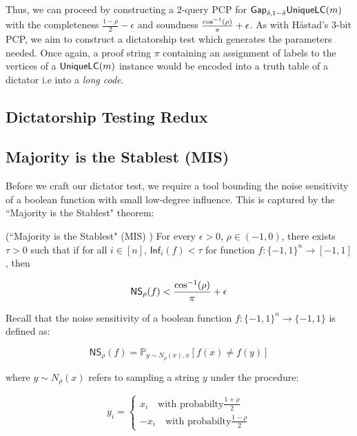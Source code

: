 Thus, we can proceed by constructing a 2-query PCP for $\mathsf{Gap}_{\delta, 1-\delta}\mathsf{UniqueLC}(m)$ with the completeness $\frac{1-\rho}{2} - \epsilon$ and soundness $\frac{\cos^{-1}(\rho)}{\pi} + \epsilon$. As with H\aa stad's 3-bit PCP, we aim to construct a dictatorship test which generates the parameters needed. Once again, a proof string $\pi$ containing an assignment of labels to the vertices of a $\mathsf{UniqueLC}(m)$ instance would be encoded into a truth table of a dictator i.e into a \emph{long code}. \newline

%
%
%
\subsection{Dictatorship Testing Redux}



%
%
%
\subsection{Majority is the Stablest (MIS)}
%
Before we craft our dictator test, we require a tool bounding the noise sensitivity of a boolean function with small low-degree influence. This is captured by the ``Majority is the Stablest" theorem:

\begin{theorem} (``Majority is the Stablest" (MIS) \cite{mossel2005noise})
For every $\epsilon > 0$, $\rho \in (-1,0)$, there exists $\tau > 0$ such that if for all $i \in [n]$, $\mathsf{Inf}_i(f) < \tau$ for function $f:\{-1,1\}^n \rightarrow [-1,1]$, then

\begin{equation}
  \mathsf{NS}_{\rho}(f) < \frac{\cos^{-1}(\rho)}{\pi} + \epsilon
\end{equation}
\end{theorem}

Recall that the noise sensitivity of a boolean function $f:\{-1,1\}^n \rightarrow \{-1,1\}$ is defined as:

\begin{equation} \label{NSdef}
  \mathsf{NS}_\rho(f)  = \mathbb{P}_{y \sim N_{\rho}(x), x} [f(x) \neq f(y)]
\end{equation}

where $y \sim N_\rho(x)$ refers to sampling a string $y$ under the procedure:

\begin{equation*}
  y_i = \begin{cases}
        x_i \quad \text{with probabilty} \frac{1 + \rho}{2} \\
        -x_i \quad \text{with probabilty} \frac{1 - \rho}{2}
        \end{cases}
\end{equation*}
\newline

